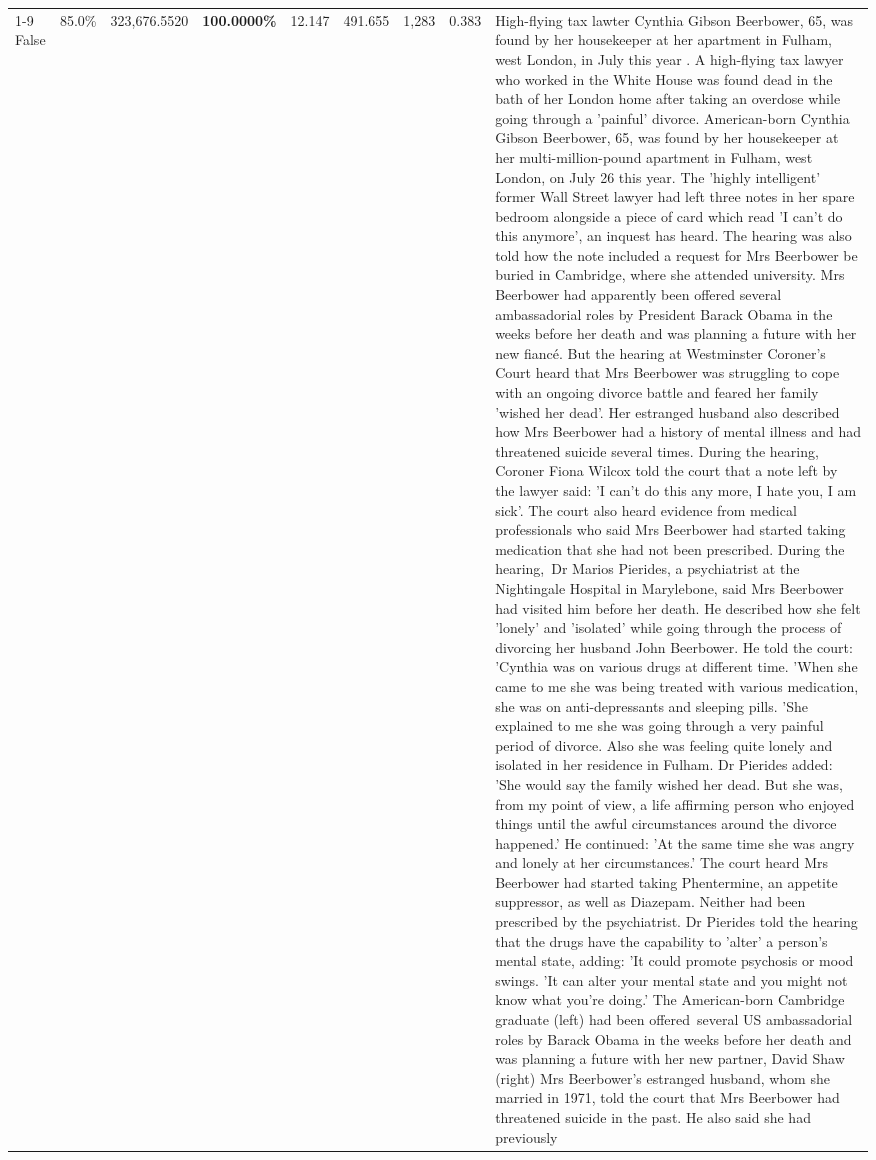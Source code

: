\begin{table}[H]
\begin{tabular}{lllrlllll}
\cline{1-9}
False & 85.0\% & 323,676.5520 & \bfseries \color{red} 100.0000\% & 12.147 & 491.655 & 1,283 & 0.383 & High-flying tax lawter Cynthia Gibson Beerbower, 65, was found by her housekeeper at her apartment in Fulham, west London, in July this year . A high-flying tax lawyer who worked in the White House was found dead in the bath of her London home after taking an overdose while going through a 'painful' divorce. American-born Cynthia Gibson Beerbower, 65, was found by her housekeeper at her multi-million-pound apartment in Fulham, west London, on July 26 this year. The 'highly intelligent' former Wall Street lawyer had left three notes in her spare bedroom alongside a piece of card which read 'I can't do this anymore', an inquest has heard. The hearing was also told how the note included a request for Mrs Beerbower be buried in Cambridge, where she attended university. Mrs Beerbower had apparently been offered several ambassadorial roles by President Barack Obama in the weeks before her death and was planning a future with her new fiancé. But the hearing at Westminster Coroner's Court heard that Mrs Beerbower was struggling to cope with an ongoing divorce battle and feared her family 'wished her dead'. Her estranged husband also described how Mrs Beerbower had a history of mental illness and had threatened suicide several times. During the hearing, Coroner Fiona Wilcox told the court that a note left by the lawyer said: 'I can't do this any more, I hate you, I am sick'. The court also heard evidence from medical professionals who said Mrs Beerbower had started taking medication that she had not been prescribed. During the hearing, Dr Marios Pierides, a psychiatrist at the Nightingale Hospital in Marylebone, said Mrs Beerbower had visited him before her death. He described how she felt 'lonely' and 'isolated' while going through the process of divorcing her husband John Beerbower. He told the court: 'Cynthia was on various drugs at different time. 'When she came to me she was being treated with various medication, she was on anti-depressants and sleeping pills. 'She explained to me she was going through a very painful period of divorce. Also she was feeling quite lonely and isolated in her residence in Fulham. Dr Pierides added: 'She would say the family wished her dead. But she was, from my point of view, a life affirming person who enjoyed things until the awful circumstances around the divorce happened.' He continued: 'At the same time she was angry and lonely at her circumstances.' The court heard Mrs Beerbower had started taking Phentermine, an appetite suppressor, as well as Diazepam. Neither had been prescribed by the psychiatrist. Dr Pierides told the hearing that the drugs have the capability to 'alter' a person's mental state, adding: 'It could promote psychosis or mood swings. 'It can alter your mental state and you might not know what you're doing.' The American-born Cambridge graduate (left) had been offered several US ambassadorial roles by Barack Obama in the weeks before her death and was planning a future with her new partner, David Shaw (right) Mrs Beerbower's estranged husband, whom she married in 1971, told the court that Mrs Beerbower had threatened suicide in the past. He also said she had previously 
\end{tabular}
\end{table}
